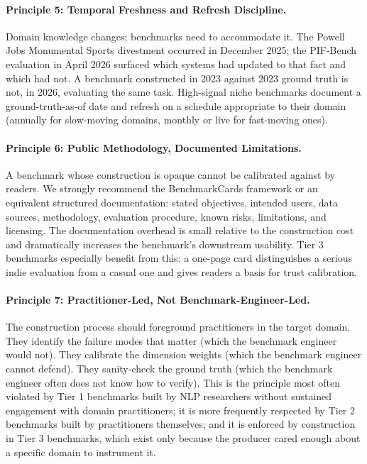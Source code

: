 \documentclass[11pt,a4paper]{article}
\begin{document}
\paragraph{Principle 5: Temporal Freshness and Refresh Discipline.}
Domain knowledge changes; benchmarks need to accommodate it. The Powell Jobs Monumental Sports divestment occurred in December 2025; the PIF-Bench evaluation in April 2026 surfaced which systems had updated to that fact and which had not. A benchmark constructed in 2023 against 2023 ground truth is not, in 2026, evaluating the same task. High-signal niche benchmarks document a ground-truth-as-of date and refresh on a schedule appropriate to their domain (annually for slow-moving domains, monthly or live for fast-moving ones).

\paragraph{Principle 6: Public Methodology, Documented Limitations.}
A benchmark whose construction is opaque cannot be calibrated against by readers. We strongly recommend the BenchmarkCards framework \citep{sokol2024benchmarkcards} or an equivalent structured documentation: stated objectives, intended users, data sources, methodology, evaluation procedure, known risks, limitations, and licensing. The documentation overhead is small relative to the construction cost and dramatically increases the benchmark's downstream usability. Tier 3 benchmarks especially benefit from this: a one-page card distinguishes a serious indie evaluation from a casual one and gives readers a basis for trust calibration.

\paragraph{Principle 7: Practitioner-Led, Not Benchmark-Engineer-Led.}
The construction process should foreground practitioners in the target domain. They identify the failure modes that matter (which the benchmark engineer would not). They calibrate the dimension weights (which the benchmark engineer cannot defend). They sanity-check the ground truth (which the benchmark engineer often does not know how to verify). This is the principle most often violated by Tier 1 benchmarks built by NLP researchers without sustained engagement with domain practitioners; it is more frequently respected by Tier 2 benchmarks built by practitioners themselves; and it is enforced by construction in Tier 3 benchmarks, which exist only because the producer cared enough about a specific domain to instrument it.
\end{document}

